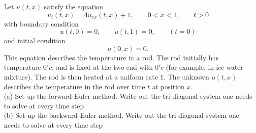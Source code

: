 Let $u(t, x)$ satisfy the equation
\[u_t(t, x) = 4u_{xx}(t, x) + 1, \qquad 0 < x < 1,\qquad  t > 0\]
with boundary condition
\[u(t, 0) = 0,\qquad u(t, 1) = 0, \qquad (t = 0)\]
and initial condition
\[u(0, x) = 0.\]
This equation describes the temperature in a rod. The rod initially has temperature
$0'c$, and is fixed at the two end with $0'c$ (for example, in ice-water mixture). The rod is
then heated at a uniform rate $1$. The unknown $u(t, x)$ describes the temperature in the
rod over time $t$ at position $x$.\\
(a) Set up the forward-Euler method. Write out the tri-diagonal system one needs
to solve at every time step \\
(b) Set up the backward-Euler method. Write out the tri-diagonal system one needs
to solve at every time step
